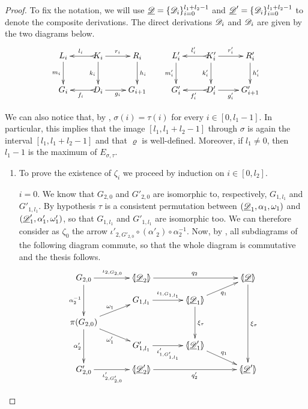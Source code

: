 \begin{proof}
	To fix the notation, we will use $\underline{\mathscr{D}}=\{\mathscr{D}_i\}_{i=0}^{l_1+l_2-1}$ and $\underline{\mathscr{D}}'=\{\mathscr{D}_i\}_{i=0}^{l_1+l_2-1}$ to denote the composite derivations. The direct derivations $\mathscr{D}_i$ and $\mathscr{D}_i$ are given by the two diagrams below.
	\[\xymatrix{L_i \ar[d]_{m_i}& K_i \ar[r]^{r_i} \ar@{>->}[l]_{l_i} \ar[d]_{k_i}& R_i \ar[d]^{h_i}& L'_i \ar[d]_{m'_i} & K'_i \ar[d]_{k'_i} \ar[r]^{r'_i} \ar@{>->}[l]_{l'_i} & R'_i \ar[d]^{h'_i}\\ G_i & D_i \ar[r]_{g_i} \ar@{>->}[l]^{f_i} & G_{i+1} & G'_i & D'_i \ar[r]_{g'_i} \ar@{>->}[l]^{f'_i} & G'_{i+1}}\]
	
	We can also notice that,  by , $\sigma(i)=\tau(i)$ for every $i\in  [0, l_1-1]$. In particular, this implies that the image  $[l_1, l_1+l_2-1]$ through $\sigma$ is again the interval $[l_1, l_1+l_2-1]$ and that $\varrho$ is well-defined.  Moreover, if $l_1\neq 0$, then $l_1-1$ is the maximum of $E_{\sigma,\tau}$. 
	
	\begin{enumerate}
		\item 		To prove the existence of $\zeta_i$ we proceed by induction on $i\in [0, l_2]$.
		
		\smallskip \noindent $i=0$. We know that $G_{2,0}$ and $G'_{2,0}$ are isomorphic to, respectively, $G_{1, l_1}$ and $G'_{1, l_1}$. By hypothesis $\tau$ is a consistent permutation between $(\underline{\mathscr{D}}_1, \alpha_1, \omega_1)$ and $(\underline{\mathscr{D}}'_1, \alpha'_1, \omega'_1)$, so that $G_{1,l_1}$ and $G'_{1, l_1}$ are isomorphic too. We can therefore consider as $\zeta_0$ the arrow $\iota'_{2, G'_{2,0}}\circ (\alpha'_2)\circ \alpha^{-1}_2$. Now, by , all subdiagrams of the following diagram commute, so that the whole diagram is commutative and the thesis follows.
		\[\xymatrix@R=10pt@C=35pt{G_{2,0}\ar[r]^{\iota_{2, G_{2,0}}} \ar[dd]_{\alpha^{-1}_2}&\lpro \der{D}_2\rpro \ar[rr]^{q_2}&&\tpro{D}\ar[dddd]^{\xi_{\sigma}}\\& G_{1,l_1} \ar[r]^{\iota_{1, G_{1, l_1}}}& \lpro \der{D}_1\ar[dd]^{\xi_\tau} \ar[ur]_{q_1} \rpro \\\pi(G_{2,0}) \ar[ur]^{\omega_1}\ar[dr]_{\omega'_1} \\ & G'_{1,l_1} \ar[r]_{\iota'_{1, G'_{1, l_1}}}& \lpro \der{D}'_1 \rpro \ar[dr]^{q_1}\\G'_{2,0} \ar@{<-}[uu]^{\alpha'_2}\ar[r]_{\iota'_{2, G'_{2,0}}}&\lpro \der{D}'_2\rpro \ar[rr]_{q'_2}&& \lpro \der{D}'\rpro }\]
		

\end{enumerate}
\end{proof}
